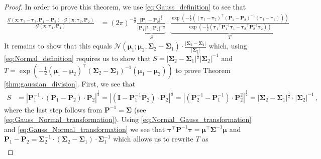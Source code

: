 \documentclass[a4paper]{article}
\newcommand{\Normal}[3]{{\mathcal N} \left({#1};{#2},{#3}\right)}
\newcommand{\Gauss}[3]{{\mathcal G} \left({#1};{#2},{#3}\right)}
\newcommand{\bs}[1]{{\boldsymbol{#1}}}
\newcommand{\transpose}[1]{{#1}^\top}
\theoremstyle{definition}
\begin{document}
\begin{proof}\label{prf:gaussian_division_theorem}
    In order to prove this theorem, we use \eqref{eq:Gauss_definition} to see that 
    \begin{align*}
        \frac{\Gauss{\bs{x}}{\bs{\tau}_1 - \bs{\tau}_2}{\bs{P}_1 - \bs{P}_2} \cdot \Gauss{\bs{x}}{\bs{\tau}_2}{\bs{P}_2}}{\Gauss{\bs{x}}{\bs{\tau}_1}{\bs{P}_1}} & = \left(2\pi\right)^{-\frac{n}{2}} \underbrace{\frac{\left|\bs{P}_1 - \bs{P}_2\right|^{\frac{1}{2}}}{\left|\bs{P}_1\right|^{\frac{1}{2}} \cdot \left|\bs{P}_2\right|^{-\frac{1}{2}}}}_S \cdot \underbrace{\frac{\exp \left( -\frac{1}{2} \left( \transpose{\left( \bs{\tau}_1 - \bs{\tau}_2 \right)} \left( \bs{P}_1 - \bs{P}_2 \right)^{-1} \left( \bs{\tau}_1 - \bs{\tau}_2 \right) \right) \right)}{\exp \left( -\frac{1}{2} \left( \transpose{\bs{\tau}_1} \bs{P}^{-1}_1 \bs{\tau}_1 - \transpose{\bs{\tau}_2} \bs{P}^{-1}_2 \bs{\tau}_2 \right) \right)}}_T 
    \end{align*}
    It remains to show that this equals $\Normal{\bs{\mu}_1}{\bs{\mu}_2}{\bs{\Sigma}_2 - \bs{\Sigma}_1} \cdot \frac{\left| \bs{\Sigma}_2 - \bs{\Sigma}_1 \right|}{\left| \bs{\Sigma}_2 \right|}$ which, using \eqref{eq:Normal_definition} requires us to show that $S =  \left|\bs{\Sigma}_2 - \bs{\Sigma}_1\right|^{\frac{1}{2}} \left| \bs{\Sigma}_2 \right|^{-1}$ and $T = \exp \left( -\frac{1}{2} \transpose{(\bs{\mu}_1-\bs{\mu}_2)} \left( \bs{\Sigma}_2 - \bs{\Sigma}_1 \right)^{-1} (\bs{\mu}_1-\bs{\mu}_2) \right)$ to prove Theorem \ref{thm:gaussian_division}. First, we see that
    \begin{align*}
        S & = \left| \bs{P}_1^{-1} \cdot \left( \bs{P}_1 - \bs{P}_2 \right) \cdot \bs{P}_2 \right|^{\frac{1}{2}} = \left| \left( \mathbf{I} - \bs{P}_1^{-1} \bs{P}_2 \right) \cdot \bs{P}_2 \right|^{\frac{1}{2}} = \left| \left( \bs{P}_2^{-1} - \bs{P}_1^{-1} \right) \cdot \bs{P}_2^2 \right|^{\frac{1}{2}} = \left| \bs{\Sigma}_2 - \bs{\Sigma}_1 \right|^{\frac{1}{2}} \cdot \left| \bs{\Sigma}_2 \right|^{-1}\,,
    \end{align*}
    where the last step follows from $\bs{P}^{-1} = \bs{\Sigma}$ (see \eqref{eq:Gauss_Normal_transformation}). Using \eqref{eq:Normal_Gauss_transformation} and \eqref{eq:Gauss_Normal_transformation} we see that $\transpose{\bs{\tau}} \bs{P}^{-1} \bs{\tau} = \transpose{\bs{\mu}} \bs{\Sigma}^{-1} \bs{\mu}$ and $\bs{P}_1 - \bs{P}_2 = \bs{\Sigma}^{-1}_2 \cdot \left( \bs{\Sigma}_2 - \bs{\Sigma}_1 \right) \cdot \bs{\Sigma}^{-1}_1$ which allows us to rewrite $T$ as
    \begin{align*}

\end{align*}
\end{proof}
\end{document}
